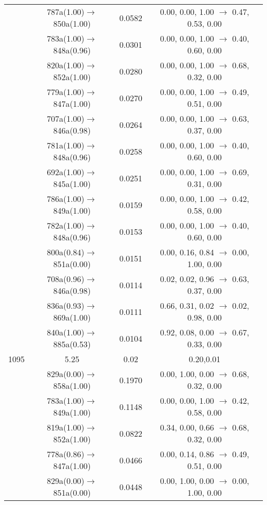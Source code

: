 \documentclass[10pt,a4paper]{article}
\begin{document}
\begin{longtable}{c|c|c|c}
 	& 787a(1.00)$\rightarrow$850a(1.00) &	 0.0582 &	 0.00, 0.00, 1.00 $\rightarrow$ 0.47, 0.53, 0.00 \\ 
 	& 783a(1.00)$\rightarrow$848a(0.96) &	 0.0301 &	 0.00, 0.00, 1.00 $\rightarrow$ 0.40, 0.60, 0.00 \\ 
 	& 820a(1.00)$\rightarrow$852a(1.00) &	 0.0280 &	 0.00, 0.00, 1.00 $\rightarrow$ 0.68, 0.32, 0.00 \\ 
 	& 779a(1.00)$\rightarrow$847a(1.00) &	 0.0270 &	 0.00, 0.00, 1.00 $\rightarrow$ 0.49, 0.51, 0.00 \\ 
 	& 707a(1.00)$\rightarrow$846a(0.98) &	 0.0264 &	 0.00, 0.00, 1.00 $\rightarrow$ 0.63, 0.37, 0.00 \\ 
 	& 781a(1.00)$\rightarrow$848a(0.96) &	 0.0258 &	 0.00, 0.00, 1.00 $\rightarrow$ 0.40, 0.60, 0.00 \\ 
 	& 692a(1.00)$\rightarrow$845a(1.00) &	 0.0251 &	 0.00, 0.00, 1.00 $\rightarrow$ 0.69, 0.31, 0.00 \\ 
 	& 786a(1.00)$\rightarrow$849a(1.00) &	 0.0159 &	 0.00, 0.00, 1.00 $\rightarrow$ 0.42, 0.58, 0.00 \\ 
 	& 782a(1.00)$\rightarrow$848a(0.96) &	 0.0153 &	 0.00, 0.00, 1.00 $\rightarrow$ 0.40, 0.60, 0.00 \\ 
 	& 800a(0.84)$\rightarrow$851a(0.00) &	 0.0151 &	 0.00, 0.16, 0.84 $\rightarrow$ 0.00, 1.00, 0.00 \\ 
 	& 708a(0.96)$\rightarrow$846a(0.98) &	 0.0114 &	 0.02, 0.02, 0.96 $\rightarrow$ 0.63, 0.37, 0.00 \\ 
 	& 836a(0.93)$\rightarrow$869a(1.00) &	 0.0111 &	 0.66, 0.31, 0.02 $\rightarrow$ 0.02, 0.98, 0.00 \\ 
 	& 840a(1.00)$\rightarrow$885a(0.53) &	 0.0104 &	 0.92, 0.08, 0.00 $\rightarrow$ 0.67, 0.33, 0.00 \\ 
 \hline1095 &	 5.25 &	 0.02 &	 0.20,0.01 \\ 
  	& 829a(0.00)$\rightarrow$858a(1.00) &	 0.1970 &	 0.00, 1.00, 0.00 $\rightarrow$ 0.68, 0.32, 0.00 \\ 
 	& 783a(1.00)$\rightarrow$849a(1.00) &	 0.1148 &	 0.00, 0.00, 1.00 $\rightarrow$ 0.42, 0.58, 0.00 \\ 
 	& 819a(1.00)$\rightarrow$852a(1.00) &	 0.0822 &	 0.34, 0.00, 0.66 $\rightarrow$ 0.68, 0.32, 0.00 \\ 
 	& 778a(0.86)$\rightarrow$847a(1.00) &	 0.0466 &	 0.00, 0.14, 0.86 $\rightarrow$ 0.49, 0.51, 0.00 \\ 
 	& 829a(0.00)$\rightarrow$851a(0.00) &	 0.0448 &	 0.00, 1.00, 0.00 $\rightarrow$ 0.00, 1.00, 0.00 \\ 

\end{longtable}
\end{document}
